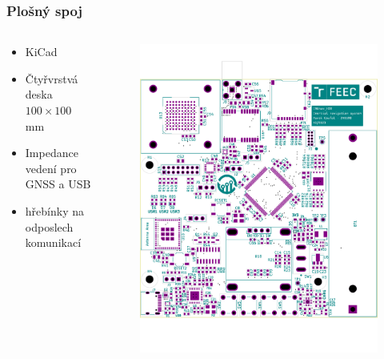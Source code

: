 \documentclass[%
  12pt,       				%
	t,                  %
	aspectratio=1610,   %
	unicode,						%
]{beamer}				    	%
\begin{document}
\begin{frame} 
	\frametitle{Plošný spoj}
	
	\begin{columns}[T] 								%
		\begin{column}{0.4\textwidth}		%
			
			\begin{itemize}
				\item KiCad
				\item Čtyřvrstvá deska $ 100 \times 100$ mm
				\item Impedance vedení pro GNSS a USB
				\item hřebínky na odposlech komunikací
			\end{itemize}
		\end{column}
		\begin{column}{0.6\textwidth}		%
			\begin{figure}%
				\centering
			    \includegraphics[width=0.78\columnwidth, trim={0 3.2cm 0 1.5cm},clip]{KiCad/boardTopParts}
			\end{figure}
		\end{column}
	\end{columns}											%
\end{frame}
\end{document}
